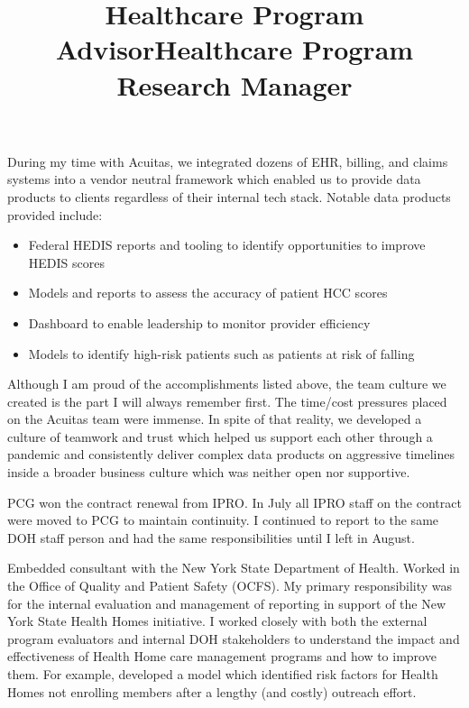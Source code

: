 \documentclass[line, mm, 10pt]{res}
\begin{document}
\begin{resume}
\begin{position}
    During my time with Acuitas, we integrated dozens of EHR, billing, and
    claims systems into a vendor neutral framework which enabled us to provide data products to clients regardless of their internal tech stack. Notable data products provided include:

    \begin{itemize}
      \item Federal HEDIS reports and tooling to identify opportunities to
      improve HEDIS scores
      \item Models and reports to assess the accuracy of patient HCC scores
      \item Dashboard to enable leadership to monitor provider efficiency
      \item Models to identify high-risk patients such as patients at risk of
      falling
    \end{itemize}
  
    Although I am proud of the accomplishments listed above, the team culture we created is the part I will always remember first. The time/cost pressures placed on the Acuitas team were immense. In spite of that reality, we developed a culture of teamwork and trust which helped us support each other through a pandemic and consistently deliver complex data products on aggressive timelines inside a broader business culture which was neither open nor supportive.
  \end{position}


  \title{Healthcare Program Advisor}
  \begin{position}
    PCG won the contract renewal from IPRO. In July all IPRO staff on the
    contract were moved to PCG to maintain continuity. I continued to report to
    the same DOH staff person and had the same responsibilities until I left in
    August.
  \end{position}


  \title{Healthcare Program Research Manager}
  \begin{position}
    Embedded consultant with the New York State Department of Health. Worked in the Office of Quality and Patient Safety (OCFS). My primary responsibility was for the internal evaluation and management of reporting in support of the New York State Health Homes initiative. I worked closely with both the
    external program evaluators and internal DOH stakeholders to understand the
    impact and effectiveness of Health Home care management programs and how to improve them. For example, developed a model which identified risk factors for Health Homes not enrolling members after a lengthy (and costly) outreach effort.
  \end{position}


\end{resume}
\end{document}
